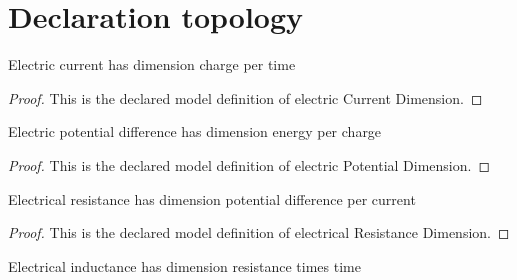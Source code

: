 \section{Declaration topology}
\begin{definition}
  \label{def:physics:phyx-mini-0989:phyxminiproblems-problemphyxmini0989-electriccurrentdimension}
  Electric current has dimension charge per time
\end{definition}
\begin{proof}
  This is the declared model definition of electric Current Dimension.
\end{proof}
\begin{definition}
  \label{def:physics:phyx-mini-0989:phyxminiproblems-problemphyxmini0989-electricpotentialdimension}
  Electric potential difference has dimension energy per charge
\end{definition}
\begin{proof}
  This is the declared model definition of electric Potential Dimension.
\end{proof}
\begin{definition}
  \label{def:physics:phyx-mini-0989:phyxminiproblems-problemphyxmini0989-electricalresistancedimension}
  Electrical resistance has dimension potential difference per current
\end{definition}
\begin{proof}
  This is the declared model definition of electrical Resistance Dimension.
\end{proof}
\begin{definition}
  \label{def:physics:phyx-mini-0989:phyxminiproblems-problemphyxmini0989-electricalinductancedimension}
  Electrical inductance has dimension resistance times time
\end{definition}
